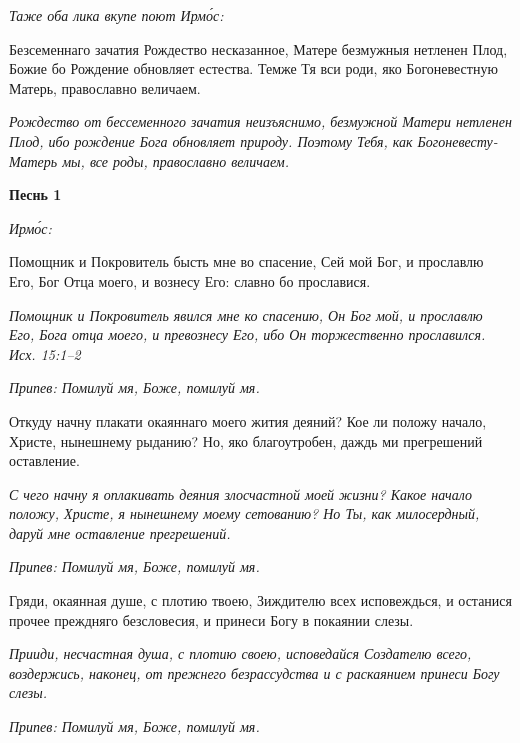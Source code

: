 \itshape Таже оба лика вкупе поют Ирмо́с:\normalfont{}


Безсеменнаго зачатия Рождество несказанное, Матере безмужныя нетленен Плод, Божие бо Рождение обновляет естества. Темже Тя вси роди, яко Богоневестную Матерь, православно величаем.


\itshape Рождество от бессеменного зачатия неизъяснимо, безмужной Матери нетленен Плод, ибо рождение Бога обновляет природу. Поэтому Тебя, как Богоневесту-Матерь мы, все роды, православно величаем.\normalfont{}




\mychapterending

 






\bfseries Песнь 1\normalfont{}


\itshape Ирмо́с:\normalfont{}


Помощник и Покровитель бысть мне во спасение, Сей мой Бог, и прославлю Его, Бог Отца моего, и вознесу Его: славно бо прославися.


\itshape Помощник и Покровитель явился мне ко спасению, Он Бог мой, и прославлю Его, Бога отца моего, и превознесу Его, ибо Он торжественно прославился. Исх. 15:1–2\normalfont{}


\itshape Припев:\normalfont{} Помилуй мя, Боже, помилуй мя.


Откуду начну плакати окаяннаго моего жития деяний? Кое ли положу начало, Христе, нынешнему рыданию? Но, яко благоутробен, даждь ми прегрешений оставление.


\itshape С чего начну я оплакивать деяния злосчастной моей жизни? Какое начало положу, Христе, я нынешнему моему сетованию? Но Ты, как милосердный, даруй мне оставление прегрешений.\normalfont{}


\itshape Припев:\normalfont{} Помилуй мя, Боже, помилуй мя.


Гряди, окаянная душе, с плотию твоею, Зиждителю всех исповеждься, и останися прочее преждняго безсловесия, и принеси Богу в покаянии слезы.


\itshape Прииди, несчастная душа, с плотию своею, исповедайся Создателю всего, воздержись, наконец, от прежнего безрассудства и с раскаянием принеси Богу слезы.\normalfont{}


\itshape Припев:\normalfont{} Помилуй мя, Боже, помилуй мя.


